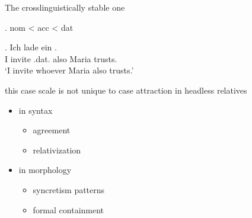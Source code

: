 \documentclass[12pt]{beamer}
\newcommand*{\mybox}[1]{\framebox{#1}} %
\begin{document}
\begin{frame}{The crosslinguistically stable one}

\ex. \ac{nom} < \ac{acc} < \ac{dat}\pause

\exg. Ich {lade ein} \mybox{\tbf{wem}}   . \\
 I invite\scsub{[acc]} .\ac{dat}. also Maria trusts\scsub{[dat]}.\\
 `I invite whoever Maria also trusts.' \label{ex:mg-acc-dat-rep} \pause

this case scale is not unique to case attraction in headless relatives \pause

\begin{itemize}
  \item in syntax
  \begin{itemize}
    \item agreement
    \item relativization
  \end{itemize} \pause
  \item in morphology
  \begin{itemize}
    \item syncretism patterns
    \item formal containment
  \end{itemize}
\end{itemize}


\end{frame}
\end{document}
